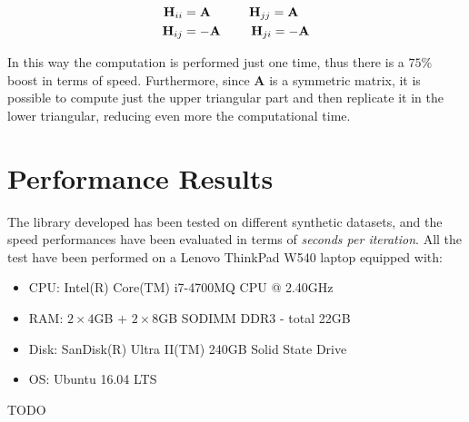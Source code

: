 \begin{align*}
    \mathbf{H}_{ii} &= \mathbf{A} \quad\qquad
    \mathbf{H}_{jj} = \mathbf{A} \\
    \mathbf{H}_{ij} &= -\mathbf{A} \:\,\qquad
    \mathbf{H}_{ji} = -\mathbf{A}
\end{align*}

\noindent In this way the computation is performed just one time, thus there is a $75\%$ boost in terms of speed. Furthermore, since $\mathbf{A}$ is a symmetric matrix, it is possible to compute just the upper triangular part and then replicate it in the lower triangular, reducing even more the computational time.

\section{Performance Results}\label{sec:performance_results}
The library developed has been tested on different synthetic datasets, and the speed performances have been evaluated in terms of \textit{seconds per iteration}. All the test have been performed on a Lenovo ThinkPad W540 laptop equipped with:

\begin{itemize}
    \item CPU: Intel(R) Core(TM) i7-4700MQ CPU @ 2.40GHz
    \item RAM: $2 \times 4$GB $+$ $2\times8$GB SODIMM DDR3 - total 22GB
    \item Disk: SanDisk(R) Ultra II(TM) 240GB Solid State Drive
    \item OS: Ubuntu 16.04 LTS
\end{itemize}

TODO